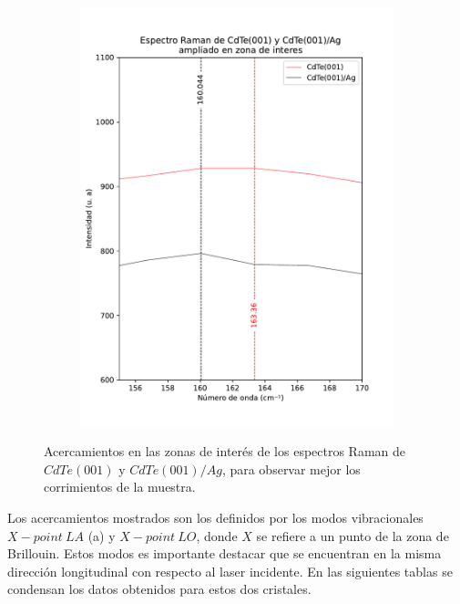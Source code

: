 \begin{figure}[H]
\begin{subfigure}[b]{0.49\textwidth}
        \includegraphics[width = 1\textwidth]{figures/chap4/cdte-ag/raman-results/raman-CdTeAg-250-T-zoom3.pdf}
    \end{subfigure}
\caption{Acercamientos en las zonas de interés de los espectros Raman de $CdTe(001)$ y $CdTe(001)/Ag$, para observar mejor los corrimientos de la muestra.}
\label{fig:raman-cdte-zoom}
\end{figure}

Los acercamientos mostrados son los definidos por los modos vibracionales $X-point\ LA$ (a) y $X-point\ LO$, donde $X$ se refiere a un punto de la zona de Brillouin. Estos modos es importante destacar que se encuentran en la misma dirección longitudinal con respecto al laser incidente. En las siguientes tablas se condensan los datos obtenidos para estos dos cristales.

